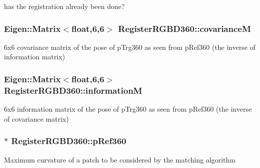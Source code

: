 has the registration already been done? \hypertarget{classRegisterRGBD360_a8181c64807ede9dc94c357daa392d9b4}{
\subsubsection[{covariance\-M}]{\setlength{\rightskip}{0pt plus 5cm}Eigen\-::\-Matrix$<$float,6,6$>$ Register\-R\-G\-B\-D360\-::covariance\-M\hspace{0.3cm}{\ttfamily [private]}}}\label{classRegisterRGBD360_a8181c64807ede9dc94c357daa392d9b4}
6x6 covariance matrix of the pose of p\-Trg360 as seen from p\-Ref360 (the inverse of information matrix) \hypertarget{classRegisterRGBD360_ad4eefda981429bfa865d1887ba11139c}{
\subsubsection[{information\-M}]{\setlength{\rightskip}{0pt plus 5cm}Eigen\-::\-Matrix$<$float,6,6$>$ Register\-R\-G\-B\-D360\-::information\-M\hspace{0.3cm}{\ttfamily [private]}}}\label{classRegisterRGBD360_ad4eefda981429bfa865d1887ba11139c}
6x6 information matrix of the pose of p\-Trg360 as seen from p\-Ref360 (the inverse of covariance matrix) \hypertarget{classRegisterRGBD360_ad6545ecea17082a932f1d0b4484e6b0c}{
\subsubsection[{p\-Ref360}]{$\ast$ Register\-R\-G\-B\-D360\-::p\-Ref360\hspace{0.3cm}{\ttfamily [private]}}}\label{classRegisterRGBD360_ad6545ecea17082a932f1d0b4484e6b0c}
Maximum curvature of a patch to be considered by the matching algorithm

